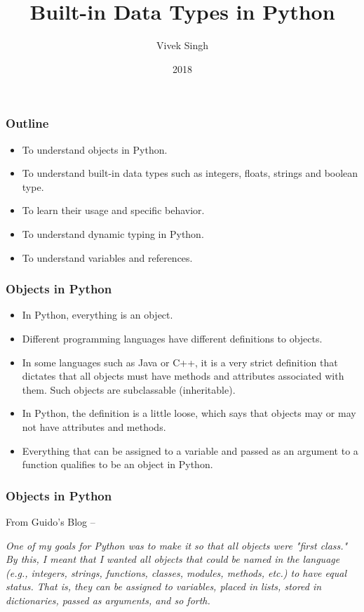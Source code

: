 \documentclass{beamer}
\title{Built-in Data Types in Python}
\author{Vivek Singh}
\institute{Information Systems Decision Sciences (ISDS)\\
MUMA College of Business\\
University of South Florida \\
Tampa, Florida}
\date{2018}
\begin{document}
 
\frame{\titlepage}
 
\begin{frame}
\frametitle{Outline}

\begin{itemize}
\item To understand objects in Python.
\item To understand built-in data types such as integers, floats, strings and boolean type.
\item To learn their usage and specific behavior.
\item To understand dynamic typing in Python.
\item To understand variables and references.
\end{itemize}
\end{frame}

\begin{frame}
\frametitle{Objects in Python}
\begin{itemize}
\item In Python, everything is an object.
\item Different programming languages have different definitions to objects.
\item In some languages such as Java or C++, it is a very strict definition that dictates that all objects must have methods and attributes associated with them. Such objects are subclassable (inheritable).
\item In Python, the definition is a little loose, which says that objects may or may not have attributes and methods.
\item Everything that can be assigned to a variable and passed as an argument to a function qualifies to be an object in Python.
\end{itemize}
\end{frame}

\begin{frame}
\frametitle{Objects in Python}
From Guido's Blog --

\textit{One of my goals for Python was to make it so that all objects were "first class." By this, I meant that I wanted all objects that could be named in the language (e.g., integers, strings, functions, classes, modules, methods, etc.) to have equal status. That is, they can be assigned to variables, placed in lists, stored in dictionaries, passed as arguments, and so forth.}
\end{frame}
\end{document}

